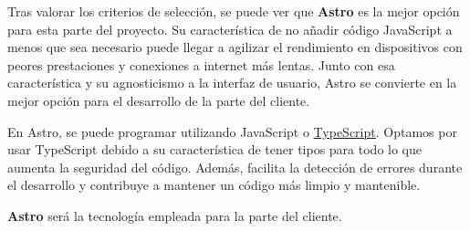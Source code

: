 Tras valorar los criterios de selección, se puede ver que \textbf{Astro} es la mejor opción para esta parte del proyecto. Su característica de no añadir código JavaScript a menos que sea necesario puede llegar a agilizar el rendimiento en dispositivos con peores prestaciones y conexiones a internet más lentas. Junto con esa característica y su agnosticismo a la interfaz de usuario, Astro se convierte en la mejor opción para el desarrollo de la parte del cliente.

En Astro, se puede programar utilizando JavaScript o \href{https://www.typescriptlang.org/}{TypeScript}. Optamos por usar TypeScript debido a su característica de tener tipos para todo lo que aumenta la seguridad del código. Además, facilita la detección de errores durante el desarrollo y contribuye a mantener un código más limpio y mantenible.

\textbf{Astro} será la tecnología empleada para la parte del cliente.
